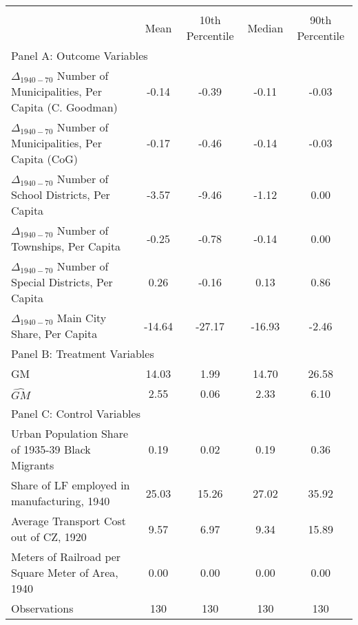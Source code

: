  \begin{tabular}{l*{4}{c}} \toprule
                &\multicolumn{4}{c}{}                   \\
                &     Mean&10th Percentile&   Median&90th Percentile\\
\cmidrule(lr){1-5}
\multicolumn{5}{l}{Panel A: Outcome Variables}\\
\cmidrule(lr){1-5}
$\Delta_{1940-70}$ Number of Municipalities, Per Capita (C. Goodman)&    -0.14&    -0.39&    -0.11&    -0.03\\
$\Delta_{1940-70}$ Number of Municipalities, Per Capita (CoG)&    -0.17&    -0.46&    -0.14&    -0.03\\
$\Delta_{1940-70}$ Number of School Districts, Per Capita&    -3.57&    -9.46&    -1.12&     0.00\\
$\Delta_{1940-70}$ Number of Townships, Per Capita&    -0.25&    -0.78&    -0.14&     0.00\\
$\Delta_{1940-70}$ Number of Special Districts, Per Capita&     0.26&    -0.16&     0.13&     0.86\\
$\Delta_{1940-70}$ Main City Share, Per Capita&   -14.64&   -27.17&   -16.93&    -2.46\\
\cmidrule(lr){1-5}
\multicolumn{5}{l}{Panel B: Treatment Variables}\\
\cmidrule(lr){1-5}
GM              &    14.03&     1.99&    14.70&    26.58\\
$\widehat{GM}$  &     2.55&     0.06&     2.33&     6.10\\
\cmidrule(lr){1-5}
\multicolumn{5}{l}{Panel C: Control Variables}\\
\cmidrule(lr){1-5}
Urban Population Share of 1935-39 Black Migrants&     0.19&     0.02&     0.19&     0.36\\
Share of LF employed in manufacturing, 1940&    25.03&    15.26&    27.02&    35.92\\
Average Transport Cost out of CZ, 1920&     9.57&     6.97&     9.34&    15.89\\
Meters of Railroad per Square Meter of Area, 1940&     0.00&     0.00&     0.00&     0.00\\
\midrule Observations    &      130   &      130   &      130   &      130   \\    \bottomrule \end{tabular}
